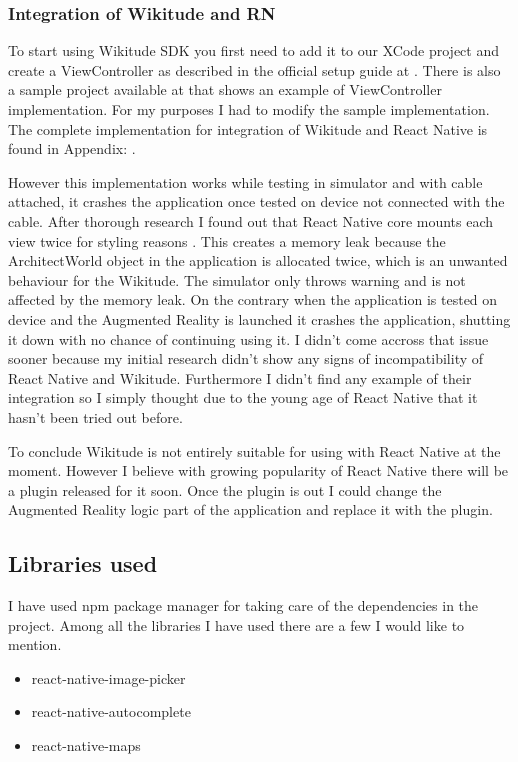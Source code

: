 \documentclass[thesis=M,english]{FITthesis}[2012/10/20]
\begin{document}
\subsubsection{Integration of Wikitude and RN}
To start using Wikitude SDK you first need to add it to our XCode project and create a ViewController as described in the official setup guide at \cite{wikitude}. There is also a sample project available at \cite{wiki-project} that shows an example of ViewController implementation. For my purposes I had to modify the sample implementation. The complete implementation for integration of Wikitude and React Native is found in Appendix: . 

However this implementation works while testing in simulator and with cable attached, it crashes the application once tested on device not connected with the cable. After thorough research I found out that React Native core mounts each view twice for styling reasons \cite{RNcode}.
This creates a memory leak because the ArchitectWorld object in the application is allocated twice, which is an unwanted behaviour for the Wikitude. The simulator only throws warning and is not affected by the memory leak. On the contrary when the application is tested on device and the Augmented Reality is launched it crashes the application, shutting it down with no chance of continuing using it. I didn't come accross that issue sooner because my initial research didn't show any signs of incompatibility of React Native and Wikitude. Furthermore I didn't find any example of their integration so I simply thought due to the young age of React Native that it hasn't been tried out before.

To conclude Wikitude is not entirely suitable for using with React Native at the moment. However I believe with growing popularity of React Native there will be a plugin released for it soon. Once the plugin is out I could change the Augmented Reality logic part of the application and replace it with the plugin.

\subsection{Libraries used}


I have used npm package manager for taking care of the dependencies in the project. Among all the libraries I have used there are a few I would like to mention.

\begin{itemize}
	\item react-native-image-picker
	\item react-native-autocomplete
	\item react-native-maps
\end{itemize}
\end{document}

